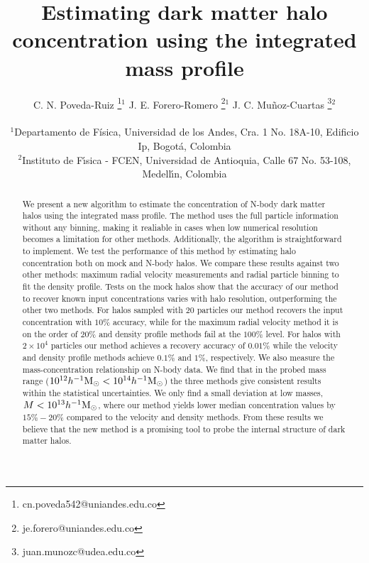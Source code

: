 \documentclass[a4,useAMS,usenatbib,usegraphicx]{mn2e}
\newcommand{\hMsun}{{\ifmmode{h^{-1}{\rm {M_{\odot}}}}\else{$h^{-1}{\rm{M_{\odot}}}$}\fi}}
\begin{document}
\title[Halo concentration from the mass profile]{Estimating dark matter
  halo concentration using the integrated mass profile} 
\author[C.N. Poveda-Ruiz, J.E. Forero-Romero, J.C. Mu\~noz-Cuartas]{
\parbox[t]{\textwidth}{\raggedright 
  C. N. Poveda-Ruiz \thanks{cn.poveda542@uniandes.edu.co}$^{1}$
  J. E. Forero-Romero \thanks{je.forero@uniandes.edu.co}$^{1}$
  J. C. Mu\~noz-Cuartas \thanks{juan.munozc@udea.edu.co}$^{2}$
}
\vspace*{6pt}\\
$^1$Departamento de F\'{i}sica, Universidad de los Andes, Cra. 1
No. 18A-10, Edificio Ip, Bogot\'a, Colombia\\
$^2$Instituto de F\'{\i}sica - FCEN, Universidad de Antioquia, Calle
67 No. 53-108, Medell\'{\i}n, Colombia
}

\maketitle

\begin{abstract}
We present a new algorithm to estimate the concentration of N-body
dark matter halos using the integrated mass profile.
The method uses the full particle information without any binning,
making it realiable in  cases when low numerical resolution becomes a
limitation for other methods.   
Additionally, the algorithm is straightforward to implement.  
We test the performance of this method by estimating halo
concentration both on mock and N-body halos. 
We compare these results against two other methods:
maximum radial velocity measurements and radial particle binning to
fit the density profile. 
Tests on the mock halos show that the accuracy of our method to
recover known input concentrations varies with halo resolution,
outperforming the other two methods. 
For halos sampled with $20$ particles our method recovers the input
concentration with $10\%$ accuracy, while for the maximum radial
velocity method it is on the order of $20\%$ and density profile
methods fail at the $100\%$ level. 
For halos with $2\times 10^4$ particles our method achieves a recovery
accuracy of $0.01\%$ while the velocity and density profile methods
achieve $0.1\%$ and $1\%$, respectively. 
We also measure the mass-concentration relationship on N-body
data. 
We find that in the probed mass range ($10^{12}\hMsun <
10^{14}\hMsun$) the three methods give consistent results within the
statistical uncertainties.   
We only find a small deviation at low masses, $M<10^{13}\hMsun$, where
our method yields lower median concentration values by $15\%-20\%$
compared to the velocity and density methods. 
From these results we believe that the new method is a promising tool
to probe the internal structure of dark matter halos.
\end{abstract}
\end{document}
